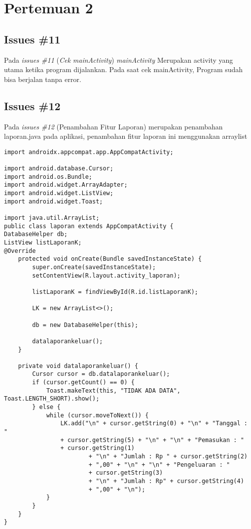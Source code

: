 \chapter{Pertemuan 2}

\section{Issues \#11}
Pada \textit{issues \#11} (\textit{Cek mainActivity}) \textit{mainActivity} 
Merupakan activity yang utama ketika program dijalankan. Pada saat cek mainActivity, Program sudah bisa berjalan tanpa error.


\section{Issues \#12}
Pada \textit{issues \#12} (Penambahan Fitur Laporan) merupakan penambahan laporan.java pada aplikasi, penambahan fitur laporan ini menggunakan arraylist
\begin{verbatim}
import androidx.appcompat.app.AppCompatActivity;

import android.database.Cursor;
import android.os.Bundle;
import android.widget.ArrayAdapter;
import android.widget.ListView;
import android.widget.Toast;

import java.util.ArrayList;
public class laporan extends AppCompatActivity { 
DatabaseHelper db;
ListView listLaporanK;
@Override
    protected void onCreate(Bundle savedInstanceState) {
        super.onCreate(savedInstanceState);
        setContentView(R.layout.activity_laporan);
            
        listLaporanK = findViewById(R.id.listLaporanK);
            
        LK = new ArrayList<>();
            
        db = new DatabaseHelper(this);
            
        datalaporankeluar();
    }
        
    private void datalaporankeluar() {
        Cursor cursor = db.datalaporankeluar();
        if (cursor.getCount() == 0) {
            Toast.makeText(this, "TIDAK ADA DATA", Toast.LENGTH_SHORT).show();
        } else {
            while (cursor.moveToNext()) {
                LK.add("\n" + cursor.getString(0) + "\n" + "Tanggal : "
                + cursor.getString(5) + "\n" + "\n" + "Pemasukan : " 
                + cursor.getString(1)
                        + "\n" + "Jumlah : Rp " + cursor.getString(2) 
                        + ",00" + "\n" + "\n" + "Pengeluaran : " 
                        + cursor.getString(3)
                        + "\n" + "Jumlah : Rp" + cursor.getString(4) 
                        + ",00" + "\n");
            }
        }
    }
}
\end{verbatim}

